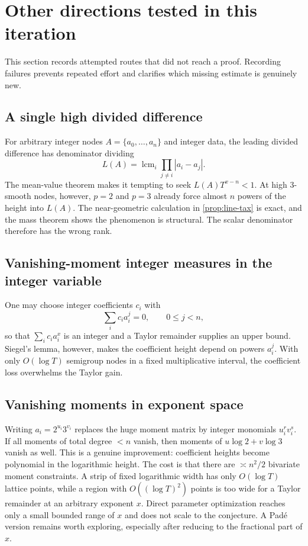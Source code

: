 \documentclass[11pt]{article}
\theoremstyle{definition}
\theoremstyle{remark}
\newcommand{\lcm}{\operatorname{lcm}}
\newcommand{\abs}[1]{\left|#1\right|}
\begin{document}
\section{Other directions tested in this iteration}

This section records attempted routes that did not reach a proof.  Recording failures prevents repeated effort and clarifies which missing estimate is genuinely new.

\subsection{A single high divided difference}
For arbitrary integer nodes $A=\{a_0,\dots,a_n\}$ and integer data, the leading divided difference has denominator dividing
\[
       L(A)=\lcm_i\prod_{j\ne i}\abs{a_i-a_j}.
\]
The mean-value theorem makes it tempting to seek $L(A)T^{x-n}<1$.  At high $3$-smooth nodes, however, $p=2$ and $p=3$ already force almost $n$ powers of the height into $L(A)$.  The near-geometric calculation in \cref{prop:line-tax} is exact, and the mass theorem shows the phenomenon is structural.  The scalar denominator therefore has the wrong rank.

\subsection{Vanishing-moment integer measures in the integer variable}
One may choose integer coefficients $c_i$ with
\[
       \sum_i c_i a_i^j=0,\qquad 0\le j<n,
\]
so that $\sum_i c_i a_i^x$ is an integer and a Taylor remainder supplies an upper bound.  Siegel's lemma, however, makes the coefficient height depend on powers $a_i^j$.  With only $O(\log T)$ semigroup nodes in a fixed multiplicative interval, the coefficient loss overwhelms the Taylor gain.

\subsection{Vanishing moments in exponent space}
Writing $a_i=2^{u_i}3^{v_i}$ replaces the huge moment matrix by integer monomials $u_i^r v_i^s$.  If all moments of total degree $<n$ vanish, then moments of
$u\log2+v\log3$ vanish as well.  This is a genuine improvement: coefficient heights become polynomial in the logarithmic height.  The cost is that there are $\asymp n^2/2$ bivariate moment constraints.  A strip of fixed logarithmic width has only $O(\log T)$ lattice points, while a region with $O((\log T)^2)$ points is too wide for a Taylor remainder at an arbitrary exponent $x$.  Direct parameter optimization reaches only a small bounded range of $x$ and does not scale to the conjecture.  A Pad\'e version remains worth exploring, especially after reducing to the fractional part of $x$.
\end{document}

